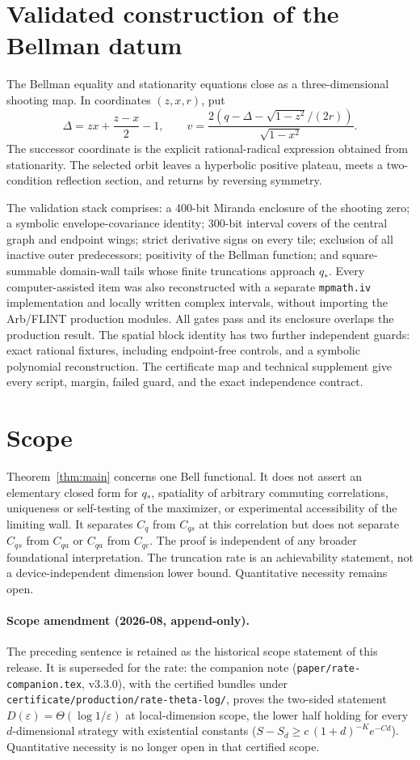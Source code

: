 \documentclass[11pt]{article}
\begin{document}
\section{Validated construction of the Bellman datum}\label{sec:certificate}

The Bellman equality and stationarity equations close as a three-dimensional
shooting map.  In coordinates $(z,x,r)$, put
\[
\Delta=zx+\frac{z-x}{2}-1,
\qquad
v=\frac{2(q-\Delta-\sqrt{1-z^2}/(2r))}{\sqrt{1-x^2}}.
\]
The successor coordinate is the explicit rational-radical expression obtained
from stationarity.  The selected orbit leaves a hyperbolic positive plateau,
meets a two-condition reflection section, and returns by reversing symmetry.

The validation stack comprises: a 400-bit Miranda enclosure of the shooting
zero; a symbolic envelope-covariance identity; 300-bit interval covers of the
central graph and endpoint wings; strict derivative signs on every tile;
exclusion of all inactive outer predecessors; positivity of the Bellman
function; and square-summable domain-wall tails whose finite truncations
approach $q_*$.  Every computer-assisted item was also reconstructed with a
separate \texttt{mpmath.iv} implementation and locally written complex
intervals, without importing the Arb/FLINT production modules.  All gates pass
and its enclosure overlaps the production result.  The spatial block identity
has two further independent guards: exact rational fixtures, including
endpoint-free controls, and a symbolic polynomial reconstruction.  The
certificate map and
technical supplement give every script, margin, failed guard, and the exact
independence contract.

\section{Scope}

Theorem~\ref{thm:main} concerns one Bell functional.  It does not assert an
elementary closed form for $q_*$, spatiality of arbitrary commuting
correlations, uniqueness or self-testing of the maximizer, or experimental
accessibility of the limiting wall.  It separates $C_q$ from $C_{qs}$ at this
correlation but does not separate $C_{qs}$ from $C_{qa}$ or $C_{qa}$ from
$C_{qc}$.  The proof is independent of any broader foundational
interpretation. The truncation rate is an achievability statement, not a
device-independent dimension lower bound. Quantitative necessity remains
open.

\paragraph{Scope amendment (2026-08, append-only).}
The preceding sentence is retained as the historical scope statement of this
release.  It is superseded for the rate: the companion note
(\texttt{paper/rate-companion.tex}, v3.3.0), with the certified bundles under
\texttt{certificate/production/rate-theta-log/}, proves the two-sided
statement $D(\varepsilon)=\Theta(\log 1/\varepsilon)$ at local-dimension
scope, the lower half holding for every $d$-dimensional strategy with
existential constants ($S-S_d \ge c\,(1+d)^{-K}e^{-Cd}$).  Quantitative
necessity is no longer open in that certified scope.
\end{document}
